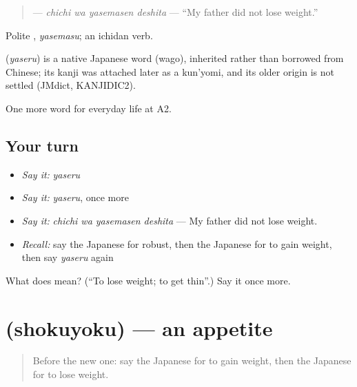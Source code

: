\begin{quote}
\textbf{ } — \emph{chichi wa yasemasen deshita} — \textquotedblleft{}My father did not lose weight.\textquotedblright{}
\end{quote}

Polite \textbf{}, \emph{yasemasu}; an ichidan verb.

\begin{cousinweb}
\textbf{} (\emph{yaseru}) is a native Japanese word (wago), inherited rather than borrowed from Chinese; its kanji was attached later as a kun'yomi, and its older origin is not settled (JMdict, KANJIDIC2).
\end{cousinweb}

\begin{grammarlens}[title={What you've built}]
One more word for everyday life at A2.
\end{grammarlens}

\subsection*{Your turn}
\begin{itemize}
\raggedright
  \item \emph{Say it:} \emph{yaseru}
  \item \emph{Say it:} \emph{yaseru}, once more
  \item \emph{Say it:} \emph{chichi wa yasemasen deshita} — My father did not lose weight.
  \item \emph{Recall:} say the Japanese for robust, then the Japanese for to gain weight, then say \emph{yaseru} again
\end{itemize}

\begin{tcolorbox}[breakable,colback=teal!4,colframe=teal!35!black,title={Before you move on}]
What does  mean? (\textquotedblleft{}To lose weight; to get thin\textquotedblright{}.) Say it once more.
\end{tcolorbox}
\section[\texorpdfstring{\ja{しょくよく} (shokuyoku)}{しょくよく (shokuyoku)}]{ (shokuyoku) — an appetite}

\label{lesson:JA-C220-shokuyoku}



\begin{quote}
Before the new one: say the Japanese for to gain weight, then the Japanese for to lose weight.
\end{quote}

